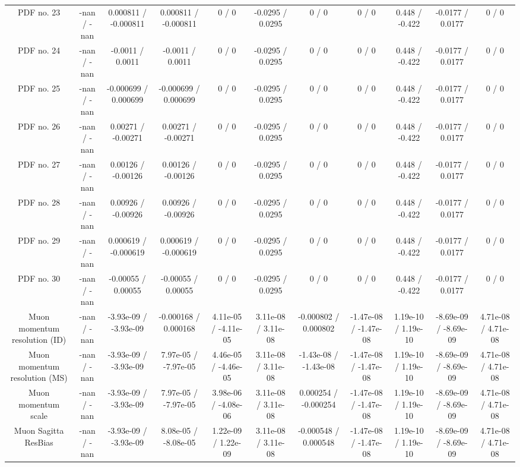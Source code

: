 \begin{table}[htbp]
\begin{center}
\begin{tabular}{|c|c|c|c|c|c|c|c|c|c|c|}
  PDF no. 23 & -nan / -nan & 0.000811 / -0.000811 & 0.000811 / -0.000811 & 0 / 0 & -0.0295 / 0.0295 & 0 / 0 & 0 / 0 & 0.448 / -0.422 & -0.0177 / 0.0177 & 0 / 0 \\ 
  PDF no. 24 & -nan / -nan & -0.0011 / 0.0011 & -0.0011 / 0.0011 & 0 / 0 & -0.0295 / 0.0295 & 0 / 0 & 0 / 0 & 0.448 / -0.422 & -0.0177 / 0.0177 & 0 / 0 \\ 
  PDF no. 25 & -nan / -nan & -0.000699 / 0.000699 & -0.000699 / 0.000699 & 0 / 0 & -0.0295 / 0.0295 & 0 / 0 & 0 / 0 & 0.448 / -0.422 & -0.0177 / 0.0177 & 0 / 0 \\ 
  PDF no. 26 & -nan / -nan & 0.00271 / -0.00271 & 0.00271 / -0.00271 & 0 / 0 & -0.0295 / 0.0295 & 0 / 0 & 0 / 0 & 0.448 / -0.422 & -0.0177 / 0.0177 & 0 / 0 \\ 
  PDF no. 27 & -nan / -nan & 0.00126 / -0.00126 & 0.00126 / -0.00126 & 0 / 0 & -0.0295 / 0.0295 & 0 / 0 & 0 / 0 & 0.448 / -0.422 & -0.0177 / 0.0177 & 0 / 0 \\ 
  PDF no. 28 & -nan / -nan & 0.00926 / -0.00926 & 0.00926 / -0.00926 & 0 / 0 & -0.0295 / 0.0295 & 0 / 0 & 0 / 0 & 0.448 / -0.422 & -0.0177 / 0.0177 & 0 / 0 \\ 
  PDF no. 29 & -nan / -nan & 0.000619 / -0.000619 & 0.000619 / -0.000619 & 0 / 0 & -0.0295 / 0.0295 & 0 / 0 & 0 / 0 & 0.448 / -0.422 & -0.0177 / 0.0177 & 0 / 0 \\ 
  PDF no. 30 & -nan / -nan & -0.00055 / 0.00055 & -0.00055 / 0.00055 & 0 / 0 & -0.0295 / 0.0295 & 0 / 0 & 0 / 0 & 0.448 / -0.422 & -0.0177 / 0.0177 & 0 / 0 \\ 
  Muon momentum resolution (ID) & -nan / -nan & -3.93e-09 / -3.93e-09 & -0.000168 / 0.000168 & 4.11e-05 / -4.11e-05 & 3.11e-08 / 3.11e-08 & -0.000802 / 0.000802 & -1.47e-08 / -1.47e-08 & 1.19e-10 / 1.19e-10 & -8.69e-09 / -8.69e-09 & 4.71e-08 / 4.71e-08 \\ 
  Muon momentum resolution (MS) & -nan / -nan & -3.93e-09 / -3.93e-09 & 7.97e-05 / -7.97e-05 & 4.46e-05 / -4.46e-05 & 3.11e-08 / 3.11e-08 & -1.43e-08 / -1.43e-08 & -1.47e-08 / -1.47e-08 & 1.19e-10 / 1.19e-10 & -8.69e-09 / -8.69e-09 & 4.71e-08 / 4.71e-08 \\ 
  Muon momentum scale & -nan / -nan & -3.93e-09 / -3.93e-09 & 7.97e-05 / -7.97e-05 & 3.98e-06 / -4.08e-06 & 3.11e-08 / 3.11e-08 & 0.000254 / -0.000254 & -1.47e-08 / -1.47e-08 & 1.19e-10 / 1.19e-10 & -8.69e-09 / -8.69e-09 & 4.71e-08 / 4.71e-08 \\ 
  Muon Sagitta ResBias & -nan / -nan & -3.93e-09 / -3.93e-09 & 8.08e-05 / -8.08e-05 & 1.22e-09 / 1.22e-09 & 3.11e-08 / 3.11e-08 & -0.000548 / 0.000548 & -1.47e-08 / -1.47e-08 & 1.19e-10 / 1.19e-10 & -8.69e-09 / -8.69e-09 & 4.71e-08 / 4.71e-08 \\ 

\end{tabular}
\end{center}
\end{table}
